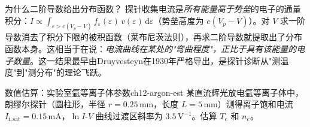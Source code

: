 \documentclass[12pt,a4paper,openany,oneside]{book}
\newcommand{\diff}{\mathrm{d}}
\newcommand{\eps}{\varepsilon}
\newcommand{\difficulty}[1]{\marginnote{\hfill\textcolor{coverMid!80}{\rule[-0.1em]{2pt}{0.9em}}\,\textcolor{coverMid}{\footnotesize\textbf{[#1]}}}}
\begin{document}
\begin{insight}{为什么二阶导数给出分布函数？}{}
探针收集电流是\emph{所有能量高于势垒}的电子的通量积分：$I \propto \int_{\eps > e(V_p - V)} f_\eps(\eps)\, v(\eps) \,\diff\eps$（势垒高度为 $e(V_p - V)$）。对 $V$ 求一阶导数消去了积分下限的被积函数（莱布尼茨法则），再求二阶导数就提取出了分布函数本身。这相当于在说：\emph{电流曲线在某处的"弯曲程度"，正比于具有该能量的电子数量}。这一结果最早由Druyvesteyn在1930年严格导出，是探针诊断从"测温度"到"测分布"的理论飞跃。
\end{insight}

\begin{example}{数值估算：实验室氩等离子体参数}{ch12-argon-est}
\difficulty{基础}
某直流辉光放电氩等离子体中，朗缪尔探针（圆柱形，半径 $r = 0.25\,\mathrm{mm}$，长度 $L = 5\,\mathrm{mm}$）测得离子饱和电流 $I_{\mathrm{i,sat}} = 0.15\,\mathrm{mA}$，$\ln I$-$V$ 曲线过渡区斜率为 $3.5\,\mathrm{V}^{-1}$。估算 $T_e$ 和 $n_e$。


\end{example}
\end{document}
